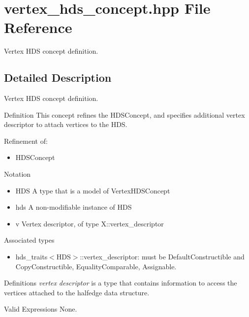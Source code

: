 \section{vertex\_\-hds\_\-concept.hpp File Reference}
\label{vertex__hds__concept_8hpp}
Vertex HDS concept definition. 



\subsection{Detailed Description}
Vertex HDS concept definition. 

\begin{Desc}
\item[Definition]This concept refines the HDSConcept, and specifies additional vertex descriptor to attach vertices to the HDS.\end{Desc}
\begin{Desc}
\item[Refinement of:]\begin{itemize}
\item HDSConcept\end{itemize}
\end{Desc}
\begin{Desc}
\item[Notation]\begin{itemize}
\item HDS A type that is a model of Vertex\-HDSConcept\item hds A non-modifiable instance of HDS\item v Vertex descriptor, of type X::vertex\_\-descriptor\end{itemize}
\end{Desc}
\begin{Desc}
\item[Associated types]\begin{itemize}
\item hds\_\-traits$<$HDS$>$::vertex\_\-descriptor: must be Default\-Constructible and Copy\-Constructible, Equality\-Comparable, Assignable.\end{itemize}
\end{Desc}
\begin{Desc}
\item[Definitions]{\em vertex\/} {\em descriptor\/} is a type that contains information to access the vertices attached to the halfedge data structure.\end{Desc}
\begin{Desc}
\item[Valid Expressions]None.\end{Desc}

